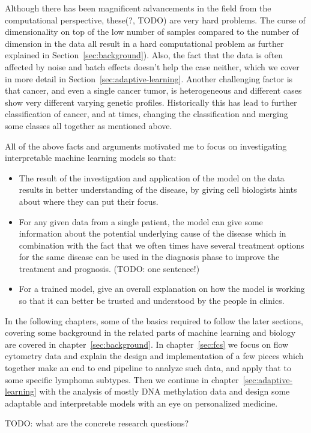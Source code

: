 Although there has been magnificent advancements in the field from the
computational perspective, these(?, TODO) are very hard problems. The curse of
dimensionality on top of the low number of samples compared to the number of
dimension in the data all result in a hard computational problem as further
explained in Section~\ref{sec:background}). Also, the fact that the data is
often affected by noise and batch effects doesn't help the case neither, which
we cover in more detail in Section~\ref{sec:adaptive-learning}. Another
challenging factor is that cancer, and even a single cancer tumor, is
heterogeneous and different cases show very different varying genetic profiles.
Historically this has lead to further classification of cancer, and at times,
changing the classification and merging some classes all together as mentioned
above.

All of the above facts and arguments motivated me to focus on investigating
interpretable machine learning models so that:
\begin{itemize}
\item The result of the investigation and application of the model on the data
  results in better understanding of the disease, by giving cell biologists
  hints about where they can put their focus.
\item For any given data from a single patient, the model can give some
  information about the potential underlying cause of the disease which in
  combination with the fact that we often times have several treatment options
  for the same disease can be used in the diagnosis phase to improve the
  treatment and prognosis. (TODO: one sentence!)
\item For a trained model, give an overall explanation on how the model is
  working so that it can better be trusted and understood by the people in
  clinics.
\end{itemize}

In the following chapters, some of the basics required to follow the later
sections, covering some background in the related parts of machine learning and
biology are covered in chapter~\ref{sec:background}. In chapter~\ref{sec:fcs} we
focus on flow cytometry data and explain the design and implementation of a few
pieces which together make an end to end pipeline to analyze such data, and
apply that to some specific lymphoma subtypes. Then we continue in
chapter~\ref{sec:adaptive-learning} with the analysis of mostly DNA methylation
data and design some adaptable and interpretable models with an eye on
personalized medicine.

TODO: what are the concrete research questions?

